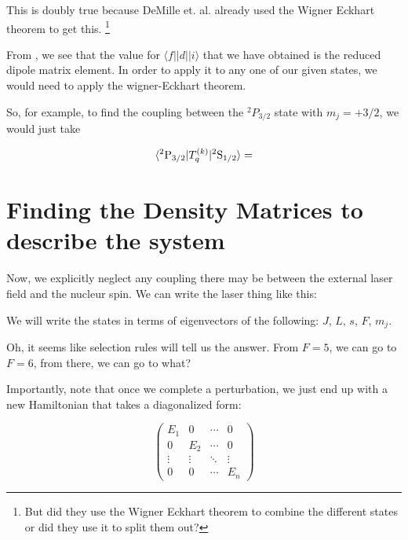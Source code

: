 This is doubly true because DeMille et. al. already used the Wigner Eckhart theorem to get this. \footnote{But did they use the Wigner Eckhart theorem to combine the different states or did they use it to split them out?} 

From \cite{demilleBudkerKimball}, we see that the value for $\langle f||d||i\rangle$ that we have obtained is the reduced dipole matrix element. In order to apply it to any one of our given states, we would need to apply the wigner-Eckhart theorem. 

So, for example, to find the coupling between the $^2 P_{3/2}$ state with $m_j=+3/2$, we would just take 

\begin{equation}
\langle ^2 \textnormal{P} _{3/2}|T_q^{(k)}|^2 \textnormal{S}_{1/2}\rangle = 
\end{equation}


\section{Finding the Density Matrices to describe the system}


Now, we explicitly neglect any coupling there may be between the external laser field and the nucleur spin. We can write the laser thing like this: 


We will write the states in terms of eigenvectors of the following: $J$, $L$, $s$, $F$, $m_j$.

Oh, it seems like selection rules will tell us the answer. From $F=5$, we can go to $F=6$, from there, we can go to what? 



Importantly, note that once we complete a perturbation, we just end up with a new Hamiltonian that takes a diagonalized form:

\begin{equation}
\begin{pmatrix}
E_1 & 0 & \cdots & 0 \\
0   & E_2 & \cdots & 0\\
\vdots&\vdots&\ddots & \vdots\\
0 & 0 & \cdots & E_n
\end{pmatrix}
\end{equation}

